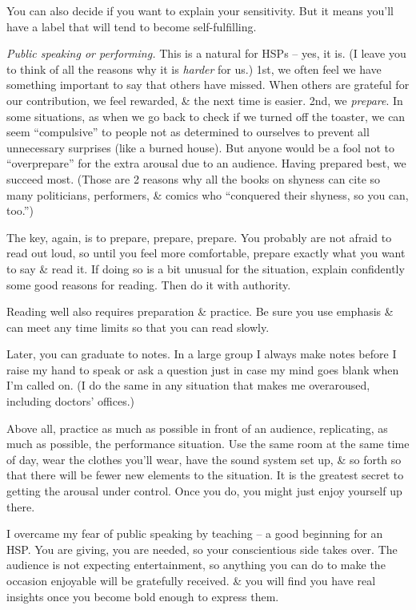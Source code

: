 \documentclass{article}
\numberwithin{equation}{section}
\begin{document}
You can also decide if you want to explain your sensitivity. But it means you'll have a label that will tend to become self-fulfilling.

\textit{Public speaking or performing.} This is a natural for HSPs -- yes, it is. (I leave you to think of all the reasons why it is \textit{harder} for us.) 1st, we often feel we have something important to say that others have missed. When others are grateful for our contribution, we feel rewarded, \& the next time is easier. 2nd, we \textit{prepare}. In some situations, as when we go back to check if we turned off the toaster, we can seem ``compulsive'' to people not as determined to ourselves to prevent all unnecessary surprises (like a burned house). But anyone would be a fool not to ``overprepare'' for the extra arousal due to an audience. Having prepared best, we succeed most. (Those are 2 reasons why all the books on shyness can cite so many politicians, performers, \& comics who ``conquered their shyness, so you can, too.'')

The key, again, is to prepare, prepare, prepare. You probably are not afraid to read out loud, so until you feel more comfortable, prepare exactly what you want to say \& read it. If doing so is a bit unusual for the situation, explain confidently some good reasons for reading. Then do it with authority.

Reading well also requires preparation \& practice. Be sure you use emphasis \& can meet any time limits so that you can read slowly.

Later, you can graduate to notes. In a large group I always make notes before I raise my hand to speak or ask a question just in case my mind goes blank when I'm called on. (I do the same in any situation that makes me overaroused, including doctors' offices.)

Above all, practice as much as possible in front of an audience, replicating, as much as possible, the performance situation. Use the same room at the same time of day, wear the clothes you'll wear, have the sound system set up, \& so forth so that there will be fewer new elements to the situation. It is the greatest secret to getting the arousal under control. Once you do, you might just enjoy yourself up there.

I overcame my fear of public speaking by teaching -- a good beginning for an HSP. You are giving, you are needed, so your conscientious side takes over. The audience is not expecting entertainment, so anything you can do to make the occasion enjoyable will be gratefully received. \& you will find you have real insights once you become bold enough to express them.
\end{document}
